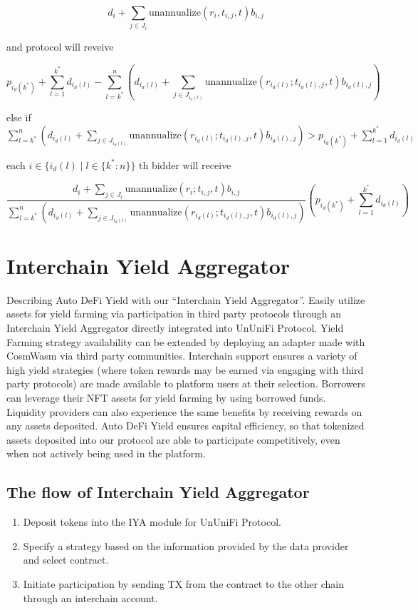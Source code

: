 \documentclass[dvipdfmx]{jsarticle}
\begin{document}
$$
  d_i + \sum_{j \in J_i} \text{unannualize}(r_i, t_{i,j}, t) b_{i,j}
$$

and protocol will reveive

$$
  p_{i_d(k^*)} + \sum_{l=1}^{k^*} d_{i_d(l)} - \sum_{l=k^*}^n \left(d_{i_d(l)} + \sum_{j \in J_{i_d(l)}} \text{unannualize}(r_{i_d(l)}; t_{i_d(l),j}, t) b_{i_d(l),j} \right)
$$

else if $\sum_{l=k^*}^n \left(d_{i_d(l)} + \sum_{j \in J_{i_d(l)}} \text{unannualize}(r_{i_d(l)}; t_{i_d(l),j}, t) b_{i_d(l),j} \right) > p_{i_d(k^*)} + \sum_{l=1}^{k^*} d_{i_d(l)}$

each $i \in \{i_d(l) \mid l \in \{k^*:n\}\}$ th bidder will receive

$$
  \frac{d_i + \sum_{j \in J_i} \text{unannualize}(r_i; t_{i,j}, t) b_{i,j}}{\sum_{l=k^*}^n \left(d_{i_d(l)} + \sum_{j \in J_{i_d(l)}} \text{unannualize}(r_{i_d(l)}; t_{i_d(l),j}, t) b_{i_d(l),j} \right)} \left( p_{i_d(k^*)} + \sum_{l=1}^{k^*} d_{i_d(l)} \right)
$$

\section{Interchain Yield Aggregator}

Describing Auto DeFi Yield with our “Interchain Yield Aggregator”. Easily utilize assets for yield farming via participation in third party protocols through an Interchain Yield Aggregator directly integrated into UnUniFi Protocol. 
Yield Farming strategy availability can be extended by deploying an adapter made with CosmWasm via third party communities. 
Interchain support ensures a variety of high yield strategies (where token rewards may be earned via engaging with third party protocols) are made available to platform users at their selection. 
Borrowers can leverage their NFT assets for yield farming by using borrowed funds. 
Liquidity providers can also experience the same benefits by receiving rewards on any assets deposited. 
Auto DeFi Yield ensures capital efficiency, so that tokenized assets deposited into our protocol are able to participate competitively, even when not actively being used in the platform.

\subsection{The flow of Interchain Yield Aggregator}
\begin{enumerate}
  \item Deposit tokens into the IYA module for UnUniFi Protocol.
  \item Specify a strategy based on the information provided by the data provider and select contract.
  \item Initiate participation by sending TX from the contract to the other chain through an interchain account.
\end{enumerate}
\end{document}
